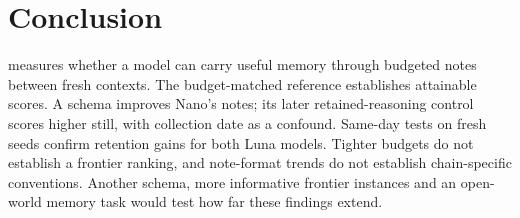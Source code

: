 \section{Conclusion}\label{sec:conclusion}

\relay{} measures whether a model can carry useful memory through budgeted notes between fresh contexts. The budget-matched reference establishes attainable scores. A schema improves Nano's notes; its later retained-reasoning control scores higher still, with collection date as a confound. Same-day tests on fresh seeds confirm retention gains for both Luna models. Tighter budgets do not establish a frontier ranking, and note-format trends do not establish chain-specific conventions. Another schema, more informative frontier instances and an open-world memory task would test how far these findings extend.
